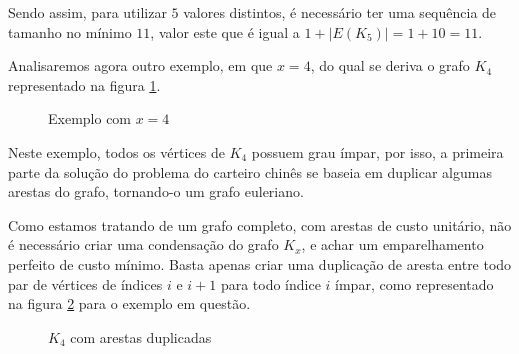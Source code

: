 \documentclass[12pt, a4paper]{article}
\begin{document}
        Sendo assim, para utilizar $5$ valores distintos, é necessário ter uma sequência de tamanho no mínimo $11$, valor este que é igual a $1 + |E(K_5)| = 1 + 10 = 11$.

        Analisaremos agora outro exemplo, em que $x=4$, do qual se deriva o grafo $K_4$ representado na figura \ref{k4}.


        \begin{figure}[h]
            \centering
            \caption{Exemplo com $x=4$}
            \label{k4}
        \end{figure}


        Neste exemplo, todos os vértices de $K_4$ possuem grau ímpar, por isso, a primeira parte da solução do problema do carteiro chinês se baseia em duplicar algumas arestas do grafo, tornando-o um grafo euleriano.

        Como estamos tratando de um grafo completo, com arestas de custo unitário, não é necessário criar uma condensação do grafo $K_x$, e achar um emparelhamento perfeito de custo mínimo.
        Basta apenas criar uma duplicação de aresta entre todo par de vértices de índices $i$ e $i+1$ para todo índice $i$ ímpar, como representado na figura \ref{k4+} para o exemplo em questão.

        \begin{figure}[h]
            \centering
            \caption{$K_4$ com arestas duplicadas}
            \label{k4+}
        \end{figure}
\end{document}
